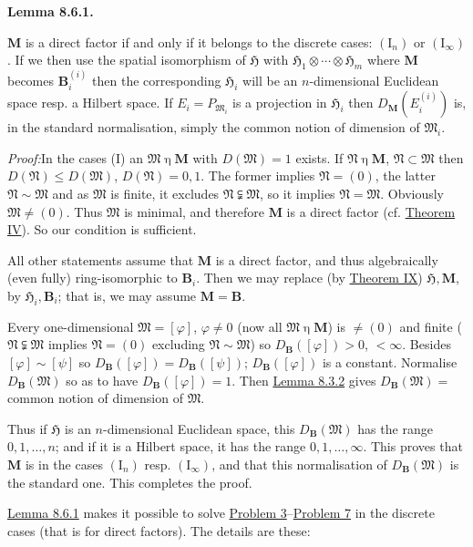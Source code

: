 \documentclass[12pt,b5paper,twoside]{article}
\newcommand{\Hspace}{\mathfrak H}
\newcommand{\M}{\mathbf M}
\newcommand{\B}{\mathbf B}
\newcommand{\Lemma}[1]{%
  \par\smallskip\noindent\phantomsection\label{lem:#1}\textbf{Lemma #1.}\enspace
}
\newcommand{\Proof}{\par\noindent\textit{Proof:}\enspace}
\newcommand{\lemref}[1]{\hyperref[lem:#1]{Lemma #1}}
\newcommand{\thmref}[1]{\hyperref[thm:#1]{Theorem #1}}
\newcommand{\probref}[1]{\hyperref[prob:#1]{Problem #1}}
\begin{document}
\Lemma{8.6.1}
$\M$ is a direct factor if and only if it belongs to the discrete cases:
$(\mathrm I_n)$ or $(\mathrm I_\infty)$. If we then use the spatial isomorphism
of $\Hspace$ with $\Hspace_1\otimes\cdots\otimes\Hspace_m$ where $\M$ becomes
$\B_i^{(i)}$ then the corresponding $\Hspace_i$ will be an $n$-dimensional
Euclidean space resp. a Hilbert space. If $E_i=P_{\mathfrak M_i}$ is a
projection in $\Hspace_i$ then $D_{\M}(E_i^{(i)})$ is, in the standard
normalisation, simply the common notion of dimension of $\mathfrak M_i$.

\Proof In the cases (I) an $\mathfrak M\mathbin\eta\M$ with
$D(\mathfrak M)=1$ exists. If $\mathfrak N\mathbin\eta\M$,
$\mathfrak N\subset\mathfrak M$ then $D(\mathfrak N)\leq D(\mathfrak M)$,
$D(\mathfrak N)=0,1$. The former implies $\mathfrak N=(0)$, the latter
$\mathfrak N\sim\mathfrak M$ and as $\mathfrak M$ is finite, it excludes
$\mathfrak N\subsetneqq\mathfrak M$, so it implies
$\mathfrak N=\mathfrak M$. Obviously $\mathfrak M\ne(0)$. Thus
$\mathfrak M$ is minimal, and therefore $\M$ is a direct factor
(cf. \thmref{IV}). So our condition is sufficient.

All other statements assume that $\M$ is a direct factor, and thus
algebraically (even fully) ring-isomorphic to $\B_i$. Then we may replace (by
\thmref{IX}) $\Hspace,\M$, by $\Hspace_i,\B_i$; that is, we may assume
$\M=\B$.

Every one-dimensional $\mathfrak M=[\varphi]$, $\varphi\ne0$ (now all
$\mathfrak M\mathbin\eta\M$) is $\ne(0)$ and finite
($\mathfrak N\subsetneqq\mathfrak M$ implies $\mathfrak N=(0)$ excluding
$\mathfrak N\sim\mathfrak M$) so
$D_{\B}([\varphi])>0$, $<\infty$. Besides
$[\varphi]\sim[\psi]$ so
$D_{\B}([\varphi])=D_{\B}([\psi])$; $D_{\B}([\varphi])$ is a constant.
Normalise $D_{\B}(\mathfrak M)$ so as to have $D_{\B}([\varphi])=1$. Then
\lemref{8.3.2} gives $D_{\B}(\mathfrak M)=$ common notion of dimension of
$\mathfrak M$.

Thus if $\Hspace$ is an $n$-dimensional Euclidean space, this
$D_{\B}(\mathfrak M)$ has the range $0,1,\ldots,n$; and if it is a Hilbert
space, it has the range $0,1,\ldots,\infty$. This proves that $\M$ is in the
cases $(\mathrm I_n)$ resp. $(\mathrm I_\infty)$, and that this normalisation of
$D_{\B}(\mathfrak M)$ is the standard one. This completes the proof.

\lemref{8.6.1} makes it possible to solve \probref{3}--\probref{7} in the
discrete cases (that is for direct factors). The details are these:
\end{document}
